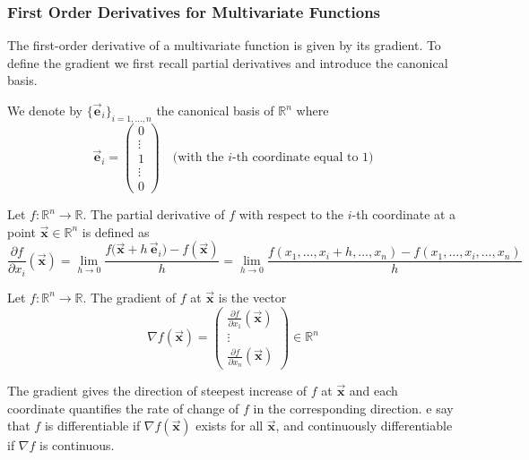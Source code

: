 \documentclass[9pt, headings=standardclasses, parskip=half]{scrartcl}
\renewcommand{\emph}[1]{\textcolor{mypurple}{#1}}
\newcommand{\vect}[1]{\vec{\boldsymbol{#1}}}
\begin{document}


\subsubsection{First Order Derivatives for Multivariate Functions}
The first-order derivative of a multivariate function is given by its \emph{gradient}. To define the gradient we first recall partial derivatives and introduce the canonical basis.

We denote by \(\{\vect{e}_{i}\}_{i=1,\ldots,n}\) the canonical basis of \(\mathbb{R}^{n}\) where
\[
\vect{e}_{i}=\begin{pmatrix}
0\\
\vdots\\
1\\
\vdots\\
0
\end{pmatrix}\quad \text{(with the \(i\)-th coordinate equal to 1)}
\]

\begin{definition}\label{def:partial_derivative}
Let \(f:\mathbb{R}^{n}\to\mathbb{R}\). The partial derivative of \(f\) with respect to the \(i\)-th coordinate at a point \(\vect{x}\in\mathbb{R}^{n}\) is defined as
\[
\frac{\partial f}{\partial x_{i}}(\vect{x})
=\lim_{h\to0}\frac{f\bigl(\vect{x}+h\,\vect{e}_{i}\bigr)-f(\vect{x})}{h}
=\lim_{h\to0}\frac{f(x_{1},\ldots,x_{i}+h,\ldots,x_{n})-f(x_{1},\ldots,x_{i},\ldots,x_{n})}{h}
\]
\end{definition}

\begin{definition}[Gradient]\label{def:gradient}
Let \(f:\mathbb{R}^{n}\to\mathbb{R}\). The \emph{gradient} of \(f\) at \(\vect{x}\) is the vector
\[
\nabla f(\vect{x})
=\begin{pmatrix}
\frac{\partial f}{\partial x_{1}}(\vect{x})\\%
\vdots\\%
\frac{\partial f}{\partial x_{n}}(\vect{x})
\end{pmatrix}\in\mathbb{R}^{n}
\]
\end{definition}
The gradient gives the direction of steepest increase of \(f\) at \(\vect{x}\) and each coordinate quantifies the rate of change of \(f\) in the corresponding direction.
e say that \(f\) is differentiable if \(\nabla f(\vect{x})\) exists for all \(\vect{x}\), and continuously differentiable if \(\nabla f\) is continuous.
\end{document}
